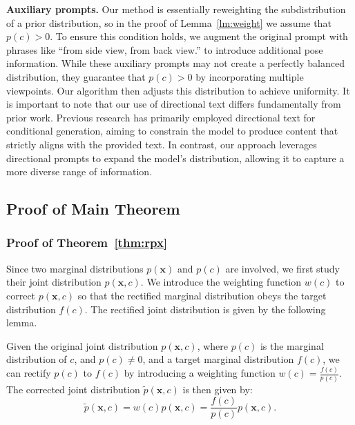 \textbf{Auxiliary prompts.}
Our method is essentially reweighting the subdistribution of a prior distribution, so in the proof of Lemma~\ref{lm:weight} we assume that $p(c) > 0$. To ensure this condition holds, we augment the original prompt with phrases like ``from side view, from back view.'' to introduce additional pose information. While these auxiliary prompts may not create a perfectly balanced distribution, they guarantee that $p(c) > 0$ by incorporating multiple viewpoints. Our algorithm then adjusts this distribution to achieve uniformity. It is important to note that our use of directional text differs fundamentally from prior work. Previous research has primarily employed directional text for conditional generation, aiming to constrain the model to produce content that strictly aligns with the provided text. In contrast, our approach leverages directional prompts to expand the model’s distribution, allowing it to capture a more diverse range of information.


\subsection{Proof of Main Theorem}\label{app:method_theorem}
\subsubsection{Proof of Theorem~\ref{thm:rpx}}
Since two marginal distributions $p(\boldsymbol{x})$ and $p(c)$ are involved, we first study their joint distribution $p(\boldsymbol{x},c)$. We introduce the weighting function $w(c)$ to correct $p(\boldsymbol{x},c)$ so that the rectified marginal distribution obeys the target distribution $f(c)$. The rectified joint distribution is given by the following lemma.

\begin{lemma}\label{lm:weight}
 Given the original joint distribution $p(\boldsymbol{x}, c)$, where $p(c)$ is the marginal distribution of $c$, and $p(c) \neq 0$, and a target marginal distribution $f(c)$, we can rectify $p(c)$ to $f(c)$ by introducing a weighting function $w(c) = \frac{f(c)}{p(c)}$. The corrected joint distribution $\tilde{p}(\boldsymbol{x}, c)$ is then given by:
    \begin{equation}\label{eq:rjoint}
 \tilde{p}(\boldsymbol{x}, c) = w(c) p(\boldsymbol{x}, c) = \frac{f(c)}{p(c)} p(\boldsymbol{x}, c).
    \end{equation}
\end{lemma}

